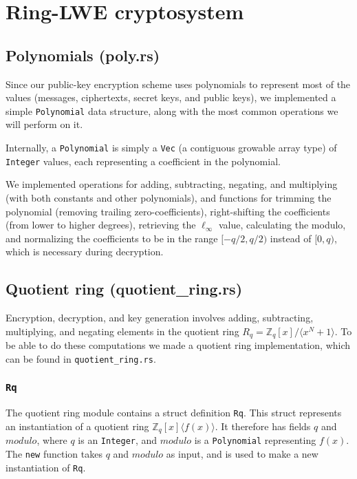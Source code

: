 \documentclass[../main.tex]{subfiles}
\begin{document}
\section{Ring-LWE cryptosystem}

\subsection{Polynomials (poly.rs)}

Since our public-key encryption scheme uses polynomials to represent most of the values (messages, ciphertexts, secret keys, and public keys), we implemented a simple \lstinline{Polynomial} data structure, along with the most common operations we will perform on it.

Internally, a \lstinline{Polynomial} is simply a \lstinline{Vec} (a contiguous growable array type) of \lstinline{Integer} values, each representing a coefficient in the polynomial.

We implemented operations for adding, subtracting, negating, and multiplying (with both constants and other polynomials), and functions for trimming the polynomial (removing trailing zero-coefficients), right-shifting the coefficients (from lower to higher degrees), retrieving the $\ell_\infty$ value, calculating the modulo, and normalizing the coefficients to be in the range $[-q/2, q/2)$ instead of $[0, q)$, which is necessary during decryption.

\subsection{Quotient ring (quotient\_ring.rs)}

Encryption, decryption, and key generation involves adding, subtracting, multiplying, and negating elements in the quotient ring $R_q = \mathbb{Z}_q[x]/\langle x^N + 1 \rangle$. To be able to do these computations we made a quotient ring implementation, which can be found in \lstinline{quotient_ring.rs}.

\subsubsection{\lstinline{Rq}}

The quotient ring module contains a struct definition \lstinline{Rq}.
This struct represents an instantiation of a quotient ring $\mathbb{Z}_q[x]  \langle f(x) \rangle$.
It therefore has fields $q$ and $modulo$, where $q$ is an \lstinline{Integer}, and $modulo$ is a \lstinline{Polynomial} representing $f(x)$. The \lstinline{new} function takes $q$ and $modulo$ as input, and is used to make a new instantiation of \lstinline{Rq}.
\end{document}
